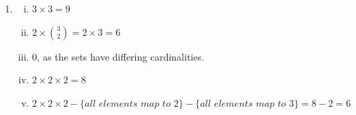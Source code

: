 \documentclass{article}
\begin{document}
\begin{enumerate}
\begin{enumerate}[(a)]
\begin{itemize}
    \end{itemize}
    \item %
          \begin{enumerate}[(i)]
                  \item
          for $A, |A|=2^{n}$. therefore, there are $2^{n}$ values of $S$. for each value of s, either $x\in S$, or $x\notin S$. $\implies$ there are $2^{n-1}$ values of $S$ where $x\in S$. $x\in A,\ \therefore$ there are $n$ values of $x$. $\implies$ there are $\bf{n\cdot2^{n-1}}$ pairs $\{(x,S)\mid x\in S,\S\in2^{A}\}$.
            \item
                  for each element $x\in A$, there are three options. either: $x\in S,x\in T,$ or $x\notin S\cup T$.
                  $\implies$, for each element $\{1,2,\ldots,n\}$, it can be in either one of the two sets $S,T$, or neither. $\therefore$ there are three possibilites for each item.
                  as there are $|A|=n$ elements, $\implies$ the total number of ways to form pairs $\{(S,T)\mid S\in 2^{A},T\in 2^{A},S\cap T=\emptyset\}$ is $\bf{3^{n}}$.
                  \end{enumerate}
  \end{enumerate}

  \item
  \begin{enumerate}[(i)]
    \item %
          $3\times3=9$
    \item %
          $2\times\binom{3}{2}=2\times3=6$
    \item %
          $0$, as the sets have differing cardinalities.
    \item
          $2\times2\times2=8$
    \item
          $2\times2\times2-\{\textit{all elements map to 2}\}-\{\textit{all elements map to 3}\}=8-2=6$
  \end{enumerate}


\end{enumerate}
\end{document}
